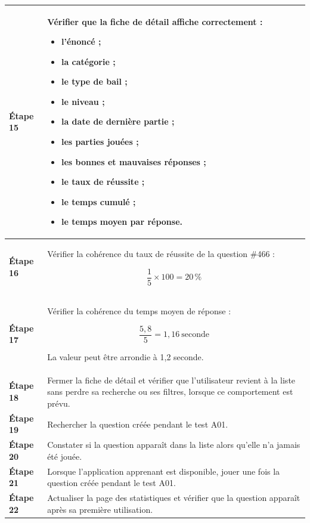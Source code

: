 \begin{longtable}{
    |>{\raggedright\arraybackslash}p{}
    |>{\raggedright\arraybackslash}p{}|
}
\textbf{Étape 15}
&
Vérifier que la fiche de détail affiche correctement :
\begin{itemize}[leftmargin=*,nosep]
    \item l'énoncé ;
    \item la catégorie ;
    \item le type de bail ;
    \item le niveau ;
    \item la date de dernière partie ;
    \item les parties jouées ;
    \item les bonnes et mauvaises réponses ;
    \item le taux de réussite ;
    \item le temps cumulé ;
    \item le temps moyen par réponse.
\end{itemize}
\\
\hline

\textbf{Étape 16}
&
Vérifier la cohérence du taux de réussite de la question \#466 :

\[
\frac{1}{5} \times 100 = 20\,\%
\]
\\
\hline

\textbf{Étape 17}
&
Vérifier la cohérence du temps moyen de réponse :

\[
\frac{5{,}8}{5} = 1{,}16\ \text{seconde}
\]

La valeur peut être arrondie à 1,2 seconde.
\\
\hline

\textbf{Étape 18}
&
Fermer la fiche de détail et vérifier que l'utilisateur revient à la liste
sans perdre sa recherche ou ses filtres, lorsque ce comportement est prévu.
\\
\hline

\textbf{Étape 19}
&
Rechercher la question créée pendant le test A01.
\\
\hline

\textbf{Étape 20}
&
Constater si la question apparaît dans la liste alors qu'elle n'a jamais
été jouée.
\\
\hline

\textbf{Étape 21}
&
Lorsque l'application apprenant est disponible, jouer une fois la question
créée pendant le test A01.
\\
\hline

\textbf{Étape 22}
&
Actualiser la page des statistiques et vérifier que la question apparaît
après sa première utilisation.
\\
\hline


\end{longtable}
